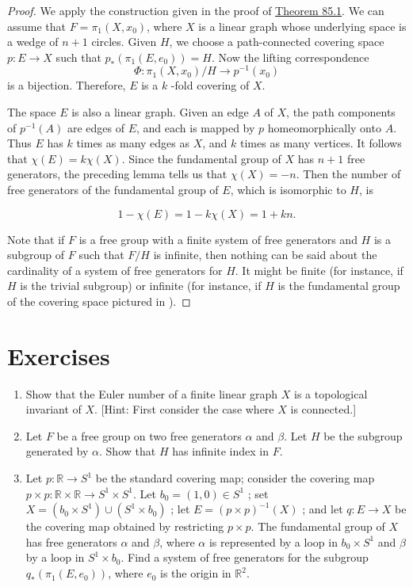 \begin{proof}
	We apply the construction given in the proof of \hyperref[thm:85.1]{Theorem 85.1}. We can assume that \(F = {\pi }_{1}( {X,x_{0}})\), where \(X\) is a linear graph whose underlying space is a wedge of \(n + 1\) circles. Given \(H\), we choose a path-connected covering space \(p : E \rightarrow X\) such that \(p_{ * }( {{\pi }_{1}( {E,e_{0}}) }) = H\). Now the lifting correspondence
\[
\Phi : {\pi }_{1}( {X,x_{0}}) /H \rightarrow {p}^{-1}( x_{0})
\]
is a bijection. Therefore, \(E\) is a \(k\) -fold covering of \(X\).

The space \(E\) is also a linear graph. Given an edge \(A\) of \(X\), the path components of \(p^{-1}( A)\) are edges of \(E\), and each is mapped by \(p\) homeomorphically onto \(A\). Thus \(E\) has \(k\) times as many edges as \(X\), and \(k\) times as many vertices. It follows that \(\chi ( E) = {k\chi }( X)\). Since the fundamental group of \(X\) has \(n + 1\) free generators, the preceding lemma tells us that \(\chi ( X) = - n\). Then the number of free generators of the fundamental group of \(E\), which is isomorphic to \(H\), is

\[
1 - \chi ( E) = 1 - {k\chi }( X) = 1 + {kn}.
\]

Note that if \(F\) is a free group with a finite system of free generators and \(H\) is a subgroup of \(F\) such that \(F/H\) is infinite, then nothing can be said about the cardinality of a system of free generators for \(H\). It might be finite (for instance, if \(H\) is the trivial subgroup) or infinite (for instance, if \(H\) is the fundamental group of the covering space pictured in ).
\end{proof}
\section*{Exercises}
\begin{enumerate}[itemsep=0.4em, parsep=0pt, topsep=0pt, partopsep=0pt, leftmargin=*, label=\arabic*., ref=\arabic*]
\item Show that the Euler number of a finite linear graph \(X\) is a topological invariant of \(X\). [Hint: First consider the case where \(X\) is connected.]
\item Let \(F\) be a free group on two free generators \(\alpha\) and \(\beta\). Let \(H\) be the subgroup generated by \(\alpha\). Show that \(H\) has infinite index in \(F\).
\item Let \(p : \mathbb{R} \rightarrow {S}^{1}\) be the standard covering map; consider the covering map \(p \times p : \mathbb{R} \times \mathbb{R} \rightarrow {S}^{1} \times {S}^{1}\). Let \(b_{0} = ( {1,0}) \in {S}^{1}\) ; set \(X = ( {b_{0} \times {S}^{1}}) \cup ( {S^{1} \times {b}_{0}})\) ; let \(E = {( p \times p) }^{-1}( X)\) ; and let \(q : E \rightarrow X\) be the covering map obtained by restricting \(p \times p\). The fundamental group of \(X\) has free generators \(\alpha\) and \(\beta\), where \(\alpha\) is represented by a loop in \(b_{0} \times {S}^{1}\) and \(\beta\) by a loop in \(S^{1} \times {b}_{0}\). Find a system of free generators for the subgroup \(q_{ * }( {{\pi }_{1}( {E,e_{0}}) })\), where \(e_{0}\) is the origin in \(\mathbb{R}^{2}\).
\end{enumerate}